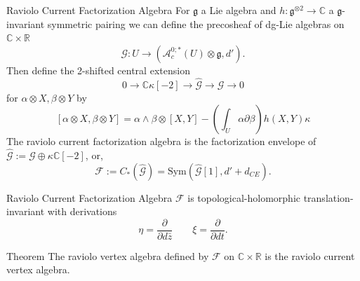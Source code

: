 \documentclass{beamer}
\newcommand{\C}{\mathbb{C}}
\newcommand{\R}{\mathbb{R}}
\newcommand{\ubar}[1]{\underaccent{\bar}{#1}}
\begin{document}

\begin{frame}{Raviolo Current Factorization Algebra}
    For $\mathfrak{g}$ a Lie algebra and $h: \mathfrak{g}^{\otimes 2} \to \C$ a $\mathfrak{g}$-invariant symmetric pairing we can define the precosheaf of dg-Lie algebras on $\C \times \R$
    \[
        \mathcal{G} :U \to (\mathcal{A}^{0;*}_c(U)\otimes \mathfrak{g}, d').
    \]
    Then define the 2-shifted central extension 
    \[
    0 \to \C \kappa[-2] \to \hat{\mathcal{G}} \to \mathcal{G} \to 0
    \]
    for $\alpha \otimes X, \beta \otimes Y$ by
    \[
       [\alpha \otimes X,\beta \otimes Y]=  \alpha \wedge \beta \otimes [X,Y]-\left( \int_U \alpha \partial \beta \right) h(X,Y) \kappa
    \]
    The raviolo current factorization algebra is the factorization envelope of $\hat{\mathcal{G}} :=\mathcal{G} \oplus \kappa\C[-2]$, or,
    \[
        \mathcal{F} := C_* (\hat{\mathcal{G}})=\mathrm{Sym}(\hat{\mathcal{G}}[1] ,d'+d_{CE}).
    \]
    
    
\end{frame}

\begin{frame}{Raviolo Current Factorization Algebra}
    $\mathcal{F}$ is topological-holomorphic translation-invariant with derivations
    \[
    \eta =\frac{\partial}{\partial d\bar{z}} \qquad \xi  =\frac{\partial}{\partial dt}.
    \]

    \begin{block}{Theorem}
        The raviolo vertex algebra defined by $\mathcal{F}$ on $\C\times \R$ is the raviolo current vertex algebra.
    \end{block}
\end{frame}
\end{document}
